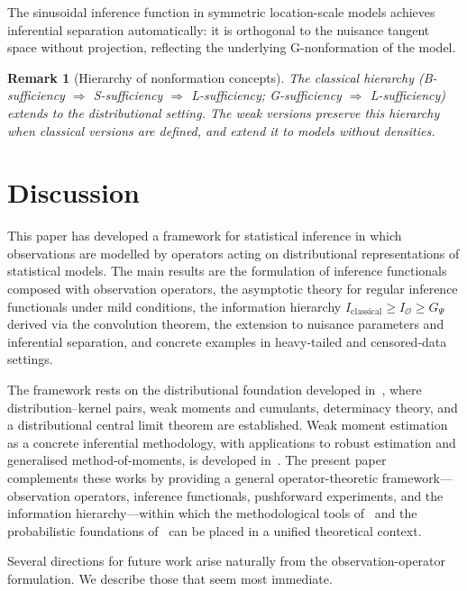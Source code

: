 \documentclass[11pt,a4paper]{article}
\newtheorem{remark}[theorem]{Remark}
\begin{document}
The sinusoidal inference function in symmetric location-scale models
achieves inferential separation automatically: it is orthogonal to the
nuisance tangent space without projection, reflecting the underlying
G-nonformation of the model.

\begin{remark}[Hierarchy of nonformation concepts]\label{rem:nonformation-hierarchy}
The classical hierarchy (B-sufficiency $\Rightarrow$ S-sufficiency
$\Rightarrow$ L-sufficiency; G-sufficiency $\Rightarrow$ L-sufficiency)
extends to the distributional setting.  The weak versions preserve this
hierarchy when classical versions are defined, and extend it to models
without densities.
\end{remark}


\section{Discussion}\label{sec:discussion}

This paper has developed a framework for statistical inference in which
observations are modelled by operators acting on distributional
representations of statistical models.  The main results are the
formulation of inference functionals composed with observation operators,
the asymptotic theory for regular inference functionals under mild
conditions, the information hierarchy
$I_{\mathrm{classical}} \geq I_{\mathcal O} \geq G_\Psi$ derived via
the convolution theorem, the extension to nuisance parameters and
inferential separation, and concrete examples in heavy-tailed and
censored-data settings.

The framework rests on the distributional foundation developed
in~\cite{LabouriauA1}, where distribution--kernel pairs, weak moments and
cumulants, determinacy theory, and a distributional central limit theorem
are established.  Weak moment estimation as a concrete inferential
methodology, with applications to robust estimation and generalised
method-of-moments, is developed in~\cite{LabouriauA2}.  The present paper
complements these works by providing a general operator-theoretic
framework---observation operators, inference functionals, pushforward
experiments, and the information hierarchy---within which the
methodological tools of~\cite{LabouriauA2} and the probabilistic
foundations of~\cite{LabouriauA1} can be placed in a unified theoretical
context.

Several directions for future work arise naturally from the
observation-operator formulation.  We describe those that seem most
immediate.
\end{document}
